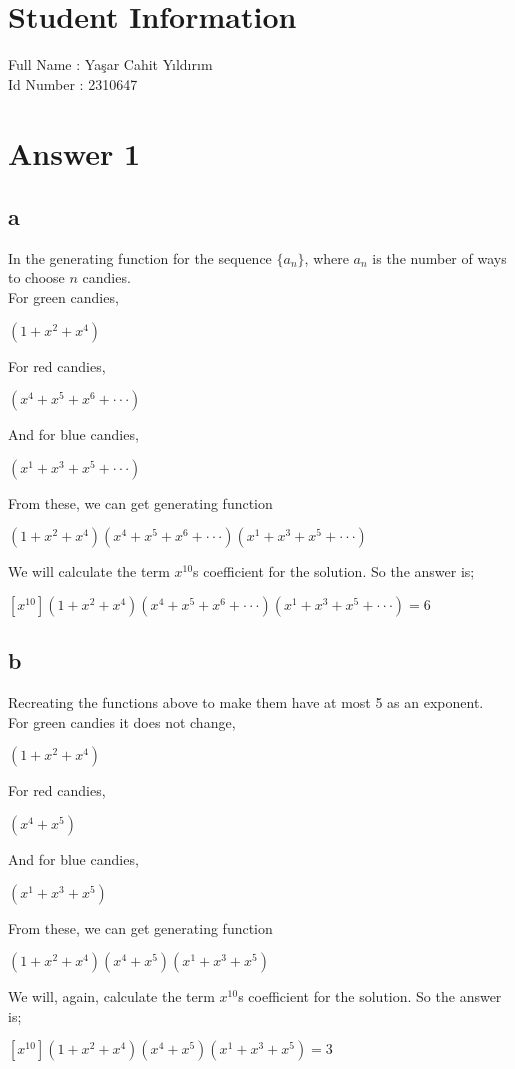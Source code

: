 \documentclass[12pt]{article}
\begin{document}
\section*{Student Information } 
Full Name :  Yaşar Cahit Yıldırım\\
Id Number :  2310647\\

\section*{Answer 1}
\subsection*{a}
In the generating function for the sequence $\{a_n\}$, where $a_n$ is the number of ways to choose $n$ candies.\\
For green candies,
\begin{center}
    $(1 + x^2 + x^4)$
\end{center}
For red candies,
\begin{center}
    $(x^4 + x^5 + x^6 + \cdot \cdot \cdot)$
\end{center}
And for blue candies,
\begin{center}
    $(x^1 + x^3 + x^5 + \cdot \cdot \cdot)$
\end{center}
From these, we can get generating function
\begin{center}
    $(1 + x^2 + x^4)(x^4 + x^5 + x^6 + \cdot \cdot \cdot)(x^1 + x^3 + x^5 + \cdot \cdot \cdot)$
\end{center}
We will calculate the term $x^{10}$s coefficient for the solution. So the answer is;
\begin{center}
    $[x^{10}] (1 + x^2 + x^4)(x^4 + x^5 + x^6 + \cdot \cdot \cdot)(x^1 + x^3 + x^5 + \cdot \cdot \cdot) = 6$
\end{center}
\subsection*{b}
Recreating the functions above to make them have at most 5 as an exponent.\\
For green candies it does not change,
\begin{center}
    $(1 + x^2 + x^4)$
\end{center}
For red candies,
\begin{center}
    $(x^4 + x^5)$
\end{center}
And for blue candies,
\begin{center}
    $(x^1 + x^3 + x^5)$
\end{center}
From these, we can get generating function
\begin{center}
    $(1 + x^2 + x^4)(x^4 + x^5)(x^1 + x^3 + x^5)$
\end{center}
We will, again,  calculate the term $x^{10}$s coefficient for the solution. So the answer is;
\begin{center}
    $[x^{10}] (1 + x^2 + x^4)(x^4 + x^5)(x^1 + x^3 + x^5) = 3$
\end{center}
\end{document}
